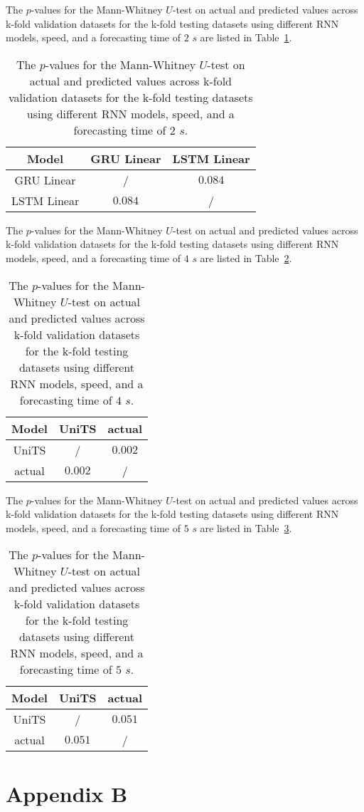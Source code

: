 The $p$-values for the Mann-Whitney $U$-test on actual and predicted values across k-fold validation datasets for the k-fold testing datasets using different RNN models, speed, and a forecasting time of $2$ $s$ are listed in Table~\ref{tab:speed:p:2}.

\begin{table}[!ht]
	\centering
	\begin{tabular}{|c|c|c|}
		\hline
		Model & GRU Linear & LSTM Linear \\ \hline
		GRU Linear & / & $\mathbf{0.084}$ \\ \hline
		LSTM Linear & $\mathbf{0.084}$ & / \\ \hline
	\end{tabular}
	\caption{The $p$-values for the Mann-Whitney $U$-test on actual and predicted values across k-fold validation datasets for the k-fold testing datasets using different RNN models, speed, and a forecasting time of $2$ $s$.}
	\label{tab:speed:p:2}
\end{table}

The $p$-values for the Mann-Whitney $U$-test on actual and predicted values across k-fold validation datasets for the k-fold testing datasets using different RNN models, speed, and a forecasting time of $4$ $s$ are listed in Table~\ref{tab:speed:p:4}.

\begin{table}[!ht]
	\centering
	\begin{tabular}{|c|c|c|}
		\hline
		Model & UniTS & actual \\ \hline
		UniTS & / & $\mathbf{0.002}$ \\ \hline
		actual & $\mathbf{0.002}$ & / \\ \hline
	\end{tabular}
	\caption{The $p$-values for the Mann-Whitney $U$-test on actual and predicted values across k-fold validation datasets for the k-fold testing datasets using different RNN models, speed, and a forecasting time of $4$ $s$.}
	\label{tab:speed:p:4}
\end{table}

The $p$-values for the Mann-Whitney $U$-test on actual and predicted values across k-fold validation datasets for the k-fold testing datasets using different RNN models, speed, and a forecasting time of $5$ $s$ are listed in Table~\ref{tab:speed:p:5}.

\begin{table}[!ht]
	\centering
	\begin{tabular}{|c|c|c|}
		\hline
		Model & UniTS & actual \\ \hline
		UniTS & / & $\mathbf{0.051}$ \\ \hline
		actual & $\mathbf{0.051}$ & / \\ \hline
	\end{tabular}
	\caption{The $p$-values for the Mann-Whitney $U$-test on actual and predicted values across k-fold validation datasets for the k-fold testing datasets using different RNN models, speed, and a forecasting time of $5$ $s$.}
	\label{tab:speed:p:5}
\end{table}

\appendix
\section{Appendix B}
\label{appB}

